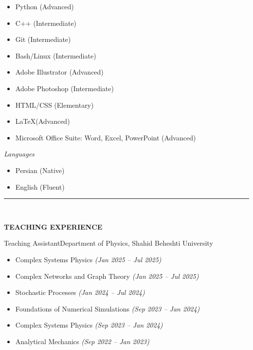 \documentclass[12pt, b4paper]{cv}
\begin{document}
\begin{multicols}{3}[]
	\begin{itemize}
	\setlength\itemsep{-0.7pt}
	  \item  Python (Advanced)
	  \item  C++ (Intermediate)
	  \item  Git (Intermediate)
	  \item  Bash/Linux (Intermediate)
	  \item  Adobe Illustrator (Advanced)
	  \item  Adobe Photoshop (Intermediate)
	  \item  HTML/CSS (Elementary)
	  \item  \LaTeX  (Advanced)
	  \item  Microsoft Office Suite: Word, Excel, PowerPoint (Advanced)
	\end{itemize}
\end{multicols}

\textit{Languages}

\begin{multicols}{3}[]
	\begin{itemize}
	\setlength\itemsep{-1pt}
	  \item  Persian (Native)
	  \item  English (Fluent)
	\end{itemize}
\end{multicols}

\vspace{-0.15in}
\rule{\textwidth}{1pt}\\
\vspace{-0.15in}

{\Large \textbf{TEACHING EXPERIENCE}}
\vspace{0.1in}

\begin{work}{}{Teaching Assistant}{Department of Physics, Shahid Beheshti University}
	\vspace{-0.2in}
	\begin{multicols}{2}
		\begin{itemize}
			\item Complex Systems Physics \textit{(Jan 2025 – Jul 2025)}
			\item Complex Networks and Graph Theory \textit{(Jan 2025 – Jul 2025)}
			\item Stochastic Processes \textit{(Jan 2024 – Jul 2024)}
			\item Foundations of Numerical Simulations \textit{(Sep 2023 – Jan 2024)}
			\item Complex Systems Physics \textit{(Sep 2023 – Jan 2024)}
			\item Analytical Mechanics \textit{(Sep 2022 – Jan 2023)}
		\end{itemize}    
	\end{multicols}
\end{work}
\vspace{-0.15in}
\end{document}
